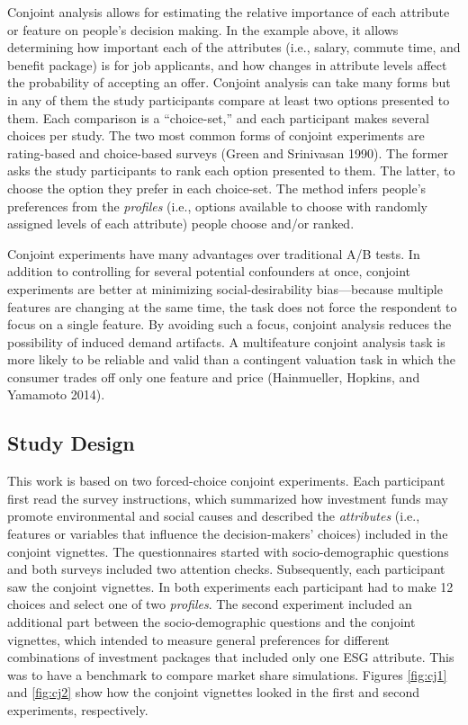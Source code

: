 \documentclass[
  12pt,
]{article}
\begin{document}
Conjoint analysis allows for estimating the relative importance of each attribute or feature on people's decision making. In the example above, it allows determining how important each of the attributes (i.e., salary, commute time, and benefit package) is for job applicants, and how changes in attribute levels affect the probability of accepting an offer. Conjoint analysis can take many forms but in any of them the study participants compare at least two options presented to them. Each comparison is a ``choice-set,'' and each participant makes several choices per study. The two most common forms of conjoint experiments are rating-based and choice-based surveys (Green and Srinivasan 1990). The former asks the study participants to rank each option presented to them. The latter, to choose the option they prefer in each choice-set. The method infers people's preferences from the \emph{profiles} (i.e., options available to choose with randomly assigned levels of each attribute) people choose and/or ranked.

Conjoint experiments have many advantages over traditional A/B tests. In addition to controlling for several potential confounders at once, conjoint experiments are better at minimizing social-desirability bias---because multiple features are changing at the same time, the task does not force the respondent to focus on a single feature. By avoiding such a focus, conjoint analysis reduces the possibility of induced demand artifacts. A multifeature conjoint analysis task is more likely to be reliable and valid than a contingent valuation task in which the consumer trades off only one feature and price (Hainmueller, Hopkins, and Yamamoto 2014).

\hypertarget{study-design}{%
\subsection{Study Design}\label{study-design}}

This work is based on two forced-choice conjoint experiments. Each participant first read the survey instructions, which summarized how investment funds may promote environmental and social causes and described the \emph{attributes} (i.e., features or variables that influence the decision-makers' choices) included in the conjoint vignettes. The questionnaires started with socio-demographic questions and both surveys included two attention checks. Subsequently, each participant saw the conjoint vignettes. In both experiments each participant had to make 12 choices and select one of two \emph{profiles}. The second experiment included an additional part between the socio-demographic questions and the conjoint vignettes, which intended to measure general preferences for different combinations of investment packages that included only one ESG attribute. This was to have a benchmark to compare market share simulations. Figures \ref{fig:cj1} and \ref{fig:cj2} show how the conjoint vignettes looked in the first and second experiments, respectively.
\end{document}
